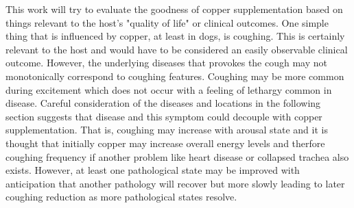 {This work will try to evaluate the goodness of copper supplementation
based on things relevant to the host's  "quality of life"
or clinical outcomes.
One simple thing that is influenced by  copper, at least in dogs,
 is coughing.
This is certainly relevant to the host and would have to be considered
an easily observable clinical outcome. 
However, the underlying diseases that provokes the
cough may not monotonically correspond to coughing features.  
Coughing may be more common during excitement which does not
occur with a feeling of lethargy common in disease.
Careful consideration of the diseases and locations in the following
section
suggests that disease and this symptom
could decouple with copper supplementation. That is, coughing may 
increase with  arousal state
and it is thought that initially  copper may increase overall 
energy levels and therfore  coughing frequency if another problem
like heart disease or collapsed trachea also exists.
However, at least one pathological state
may be improved with anticipation that another pathology will
recover but more slowly leading to later coughing reduction as more
pathological states resolve. 

} %


\newcommand{\mjmecu}[2]{\item {\bf #1} { #2}}
\newcommand{\mjmss}[1]{\subsubsection{ #1}}

